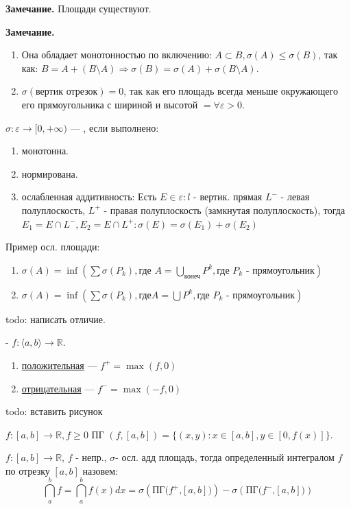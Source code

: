 \textbf{Замечание.} Площади существуют.

\textbf{Замечание.} \begin{enumerate}
    \item Она обладает монотонностью по включению: $A \subset B, \sigma(A) \leq \sigma(B)$, так как: $B = A + (B \setminus A) \Rightarrow \sigma(B) = \sigma(A) + \sigma(B \setminus A)$.
    \item $\sigma(\text{вертик отрезок})=0$, так как его площадь всегда меньше окружающего его прямоугольника с шириной и высотой $= \forall \varepsilon > 0$.
\end{enumerate}

  $\sigma:\varepsilon\rightarrow [0,+\infty)$ --- , если выполнено:
\begin{enumerate}
    \item монотонна.
    \item нормирована.
    \item ослабленная аддитивность: Есть $E \in \varepsilon: l $ - вертик. прямая $L^-$ - левая полуплоскость, $L^{+}$ - правая полуплоскость (замкнутая полуплоскость), тогда  $E_1 = E\cap L^-, E_2 = E \cap L^+: \sigma(E)=\sigma(E_1)+\sigma(E_2)$
\end{enumerate}

Пример осл. площади:
\begin{enumerate}
    \item $\sigma(A) = \inf (\sum \sigma(P_k), \text{где $A = \bigcup\limits_{\text{конеч}}P^k, \text{где $P_k$ - прямоугольник}$})$ 
    \item $\sigma(A) = \inf (\sum \sigma(P_k), \text{где} A = \bigcup P^k, \text{где $P_k$ - прямоугольник})$
\end{enumerate}

todo: написать отличие.

  - $f:\langle a,b\rangle \rightarrow \mathbb{R} $.
\begin{enumerate}
    \item \uline{положительная} --- $f^+ = \max(f,0)$
    \item \uline{отрицательная} --- $f^- = \max(-f,0)$
\end{enumerate}

todo: вставить рисунок

 $f:[a,b] \rightarrow \mathbb{R}, f\geq 0$ ПГ $(f,[a,b]) = \{(x,y): x\in [a,b], y \in [0,f(x)]\}$.

 $f: [a,b] \rightarrow \mathbb{R}$, $f$ - непр., $\sigma $- осл. адд площадь, тогда определенный интегралом $f$ по отрезку $[a,b]$ назовем: $$\dint\limits_{a}^b f =\dint\limits_{a}^b f(x) dx =\sigma(\text{ПГ($f^+$,$[a,b]$)})-\sigma(\text{ПГ($f^-$,$[a,b]$)})$$

